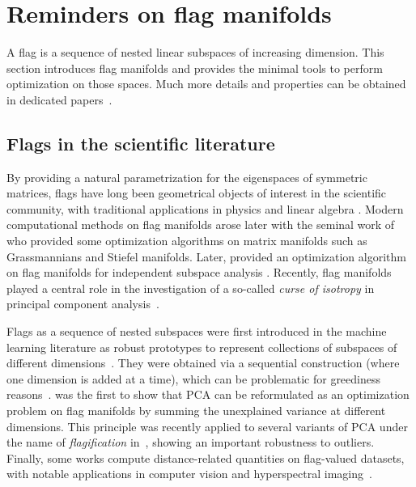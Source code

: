 \section{Reminders on flag manifolds}\label{sec:flags}

A flag is a sequence of nested linear subspaces of increasing dimension.
This section introduces flag manifolds and provides the minimal tools to perform optimization on those spaces. Much more details and properties can be obtained in dedicated papers~\citep{ye_optimization_2022}.

\subsection{Flags in the scientific literature}
By providing a natural parametrization for the eigenspaces of symmetric matrices, flags have long been geometrical objects of interest in the scientific community, with traditional applications in physics \citep{arnold_modes_1972} and linear algebra \citep{ammar_geometry_1986}.
Modern computational methods on flag manifolds arose later with the seminal work of \citet{edelman_geometry_1998} who provided some optimization algorithms on matrix manifolds such as Grassmannians and Stiefel manifolds.
Later, \citet{nishimori_riemannian_2006} provided an optimization algorithm on flag manifolds for independent subspace analysis \citep{cardoso_multidimensional_1998, hyvarinen_emergence_2000}.
Recently, flag manifolds played a central role in the investigation of a so-called \textit{curse of isotropy} in principal component analysis~\citep{szwagier_curse_2024}.

Flags as a sequence of nested subspaces were first introduced in the machine learning literature as robust prototypes to represent collections of subspaces of different dimensions~\citep{draper_flag_2014,mankovich_flag_2022}.
They were obtained via a sequential construction (where one dimension is added at a time), which can be problematic for greediness reasons~\citep{huber_projection_1985,lerman_overview_2018}.
\citet{pennec_barycentric_2018} was the first to show that PCA can be reformulated as an optimization problem on flag manifolds by summing the unexplained variance at different dimensions. This principle was recently applied to several variants of PCA under the name of \textit{flagification} in~\citet{mankovich_fun_2024}, showing an important robustness to outliers.
Finally, some works compute distance-related quantities on flag-valued datasets, with notable applications in computer vision and hyperspectral imaging~\citep{ma_flag_2021, nguyen_closed-form_2022, mankovich_chordal_2023, szwagier_rethinking_2023}.


